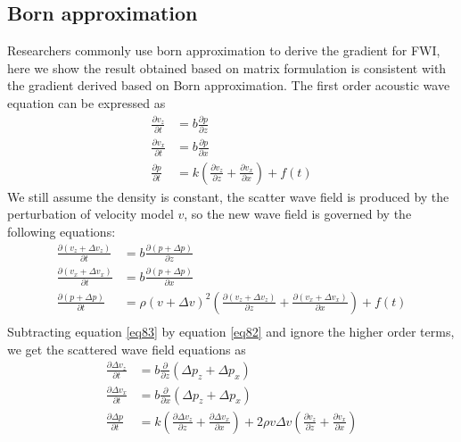 \documentclass[revised,endfloat]{geophysics}
\begin{document}
\subsection{Born approximation}
Researchers commonly use born approximation to derive the gradient for FWI, here we show the result obtained based on matrix formulation is consistent with the gradient derived based on Born approximation.  
The first order acoustic wave equation can be expressed as
\begin{equation}
\begin{split}
 \frac{\partial v_z}{\partial t} &=  b \frac{\partial p}{\partial z}  \\
 \frac{\partial v_x}{\partial t} &=  b \frac{\partial p}{\partial x}  \\
\frac{\partial p}{\partial t} &= k \left(\frac{\partial v_z}{\partial z} + \frac{\partial v_x}{\partial x} \right) + f(t)
\end{split}
\label{eq82}
\end{equation}
We still assume the density is constant, the scatter wave field is produced by the perturbation of velocity model $v$, so the new wave field is governed by the following equations:
 \begin{equation}
 \begin{split}
\frac{\partial (v_z + \Delta v_z)}{\partial t} &=  b \frac{\partial (p + \Delta p) }{\partial z} \\
\frac{\partial (v_x + \Delta v_x)}{\partial t} &=  b \frac{\partial (p + \Delta p) }{\partial x} \\
\frac{\partial (p + \Delta p)}{\partial t} &= \rho (v+\Delta v)^2 \left( \frac{\partial (v_z + \Delta v_z)}{\partial z} + \frac{\partial( v_x +\Delta v_x)}{\partial x} \right)+ f(t)\\
\end{split}
\label{eq83}
 \end{equation}
Subtracting equation \ref{eq83} by equation \ref{eq82} and ignore the higher order terms, we get the scattered wave field equations as
\begin{equation}
\begin{split}
\frac{\partial \Delta v_z}{\partial t} &= b \frac{\partial }{\partial z} \left(\Delta p_z  + \Delta p_x \right) \\
\frac{\partial \Delta v_x}{\partial t} &=  b \frac{\partial }{\partial x} \left(\Delta p_z  + \Delta p_x \right) \\
\frac{\partial  \Delta p}{\partial t} &= k \left( \frac{\partial  \Delta v_z}{\partial z} +  \frac{\partial  \Delta v_x}{\partial x} \right) + 2\rho v \Delta v \left( \frac{\partial v_z}{\partial z} +  \frac{\partial v_x}{\partial x} \right) \\
\end{split}
\label{eq84}
\end{equation}
\end{document}
